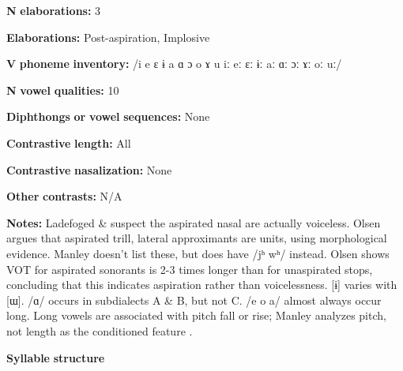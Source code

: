 \begin{styleBody}
\textbf{N} \textbf{elaborations:} 3
\end{styleBody}

\begin{styleBody}
\textbf{Elaborations:} Post-aspiration, Implosive
\end{styleBody}

\begin{styleBody}
\textbf{V} \textbf{phoneme} \textbf{inventory:} /i e ɛ ɨ a ɑ ɔ o ɤ u iː eː ɛː ɨː aː ɑː ɔː ɤː oː uː/
\end{styleBody}

\begin{styleBody}
\textbf{N} \textbf{vowel} \textbf{qualities:} 10
\end{styleBody}

\begin{styleBody}
\textbf{Diphthongs} \textbf{or} \textbf{vowel} \textbf{sequences:} None
\end{styleBody}

\begin{styleBody}
\textbf{Contrastive} \textbf{length:} All
\end{styleBody}

\begin{styleBody}
\textbf{Contrastive} \textbf{nasalization:} None
\end{styleBody}

\begin{styleBody}
\textbf{Other} \textbf{contrasts:} N/A
\end{styleBody}

\begin{styleBody}
\textbf{Notes:} Ladefoged \& \citet[116]{Maddieson1996} suspect the aspirated nasal are actually voiceless. Olsen argues that aspirated trill, lateral approximants are units, using morphological evidence. Manley doesn’t list these, but does have /jʰ wʰ/ instead. Olsen shows VOT for aspirated sonorants is 2-3 times longer than for unaspirated stops, concluding that this indicates aspiration rather than voicelessness. [ɨ] varies with [ɯ]. /ɑ/ occurs in subdialects A \& B, but not C. /e o a/ almost always occur long. Long vowels are associated with pitch fall or rise; Manley analyzes pitch, not length as the conditioned feature \citep[15]{Manley1972}.
\end{styleBody}

\begin{styleBody}
\textbf{Syllable} \textbf{structure}
\end{styleBody}

